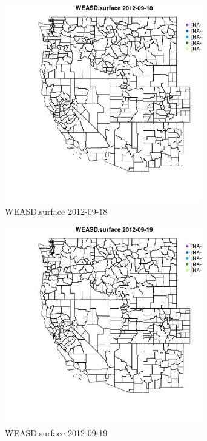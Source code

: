 \begin{figure} 
\centering  
\includegraphics[width=0.77\textwidth]{Code_Outputs/ML_input_report_ML_input_PM25_Step5_part_d_de_duplicated_aves_ML_input_MapObsWEASDsurface2012-09-18.jpg} 
\caption{\label{fig:ML_input_report_ML_input_PM25_Step5_part_d_de_duplicated_aves_ML_inputMapObsWEASDsurface2012-09-18}WEASD.surface 2012-09-18} 
\end{figure} 
 

\begin{figure} 
\centering  
\includegraphics[width=0.77\textwidth]{Code_Outputs/ML_input_report_ML_input_PM25_Step5_part_d_de_duplicated_aves_ML_input_MapObsWEASDsurface2012-09-19.jpg} 
\caption{\label{fig:ML_input_report_ML_input_PM25_Step5_part_d_de_duplicated_aves_ML_inputMapObsWEASDsurface2012-09-19}WEASD.surface 2012-09-19} 
\end{figure} 
 

